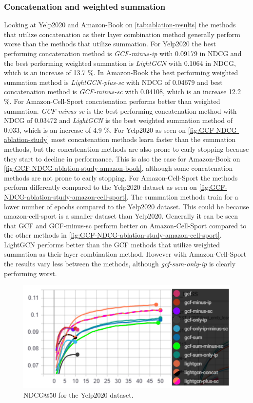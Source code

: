 \subsubsection{Concatenation and weighted summation}
Looking at Yelp2020 and Amazon-Book on \autoref{tab:ablation-results} the methods that utilize concatenation as their layer combination method generally perform worse than the methods that utilize summation.
For Yelp2020 the best performing concatenation method is \textit{GCF-minus-ip} with 0.09179 in NDCG and the best performing weighted summation is \textit{LightGCN} with 0.1064 in NDCG, which is an increase of 13.7 \%.
In Amazon-Book the best performing weighted summation method is \textit{LightGCN-plus-sc} with NDCG of 0.04679 and best concatenation method is \textit{GCF-minus-sc} with 0.04108, which is an increase 12.2 \%.
For Amazon-Cell-Sport concatenation performs better than weighted summation.
\textit{GCF-minus-sc} is the best performing concatenation method with NDCG of 0.03472 and \textit{LightGCN} is the best weighted summation method of 0.033, which is an increase of 4.9 \%.
For Yelp2020 as seen on \autoref{fig:GCF-NDCG-ablation-study} most concatenation methods learn faster than the summation methods, but the concatenation methods are also prone to early stopping because they start to decline in performance.
This is also the case for Amazon-Book on \autoref{fig:GCF-NDCG-ablation-study-amazon-book}, although some concatenation methods are not prone to early stopping.
For Amazon-Cell-Sport the methods perform differently compared to the Yelp2020 dataset as seen on \autoref{fig:GCF-NDCG-ablation-study-amazon-cell-sport}.
The summation methods train for a lower number of epochs compared to the Yelp2020 dataset.
This could be because amazon-cell-sport is a smaller dataset than Yelp2020.
Generally it can be seen that GCF and GCF-minus-sc perform better on Amazon-Cell-Sport compared to the other methods in \autoref{fig:GCF-NDCG-ablation-study-amazon-cell-sport}.
LightGCN performs better than the GCF methods that utilize weighted summation as their layer combination method.
However with Amazon-Cell-Sport the results vary less between the methods, although \textit{gcf-sum-only-ip} is clearly performing worst.
\begin{figure}[]
    \includegraphics[width=\linewidth]{figures/gcf-all-ndcg.png}
    \caption{NDCG@50 for the Yelp2020 dataset.}
    \label{fig:GCF-NDCG-ablation-study}
\end{figure}
